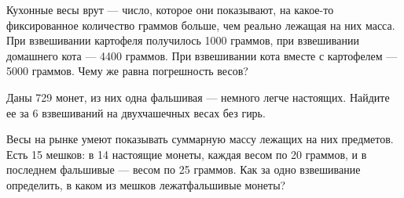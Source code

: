 ﻿

\begin{enumerate}
\itA Кухонные весы врут — число, которое они показывают, на какое-то фиксированное количество граммов больше, чем реально лежащая на них масса. При взвешивании картофеля получилось 1000 граммов, при взвешивании домашнего кота — 4400 граммов. При взвешивании кота вместе с картофелем — 5000 граммов. Чему же равна погрешность весов?

\itB Даны 729 монет, из них одна фальшивая — немного легче настоящих. Найдите ее за 6 взвешиваний на двухчашечных весах без гирь.

\itC Весы на рынке умеют показывать суммарную массу лежащих на них предметов. Есть 15 мешков: в 14 настоящие монеты, каждая весом по 20 граммов, и в последнем фальшивые — весом по 25 граммов. Как за одно взвешивание определить, в каком из мешков лежат\linebreak фальшивые монеты?
\end{enumerate}